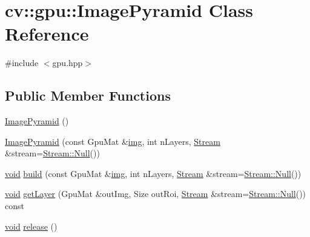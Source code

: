 \hypertarget{classcv_1_1gpu_1_1ImagePyramid}{\section{cv\-:\-:gpu\-:\-:Image\-Pyramid Class Reference}
\label{classcv_1_1gpu_1_1ImagePyramid}
}


{\ttfamily \#include $<$gpu.\-hpp$>$}

\subsection*{Public Member Functions}
\begin{DoxyCompactItemize}
\item 
\hyperlink{classcv_1_1gpu_1_1ImagePyramid_a3d5bb59a2aac09dfd542b9a4e805f0ad}{Image\-Pyramid} ()
\item 
\hyperlink{classcv_1_1gpu_1_1ImagePyramid_a68fb8a2ad9fb79b4290c4475c1bc04db}{Image\-Pyramid} (const Gpu\-Mat \&\hyperlink{legacy_8hpp_a5349238b3772bed6eae0fda3117ccfef}{img}, int n\-Layers, \hyperlink{classcv_1_1gpu_1_1Stream}{Stream} \&stream=\hyperlink{classcv_1_1gpu_1_1Stream_af96c23564834f88333dcb8997df553f1}{Stream\-::\-Null}())
\item 
\hyperlink{legacy_8hpp_a8bb47f092d473522721002c86c13b94e}{void} \hyperlink{classcv_1_1gpu_1_1ImagePyramid_a4fe3f5291035fec7f62ea4fe10c431c8}{build} (const Gpu\-Mat \&\hyperlink{legacy_8hpp_a5349238b3772bed6eae0fda3117ccfef}{img}, int n\-Layers, \hyperlink{classcv_1_1gpu_1_1Stream}{Stream} \&stream=\hyperlink{classcv_1_1gpu_1_1Stream_af96c23564834f88333dcb8997df553f1}{Stream\-::\-Null}())
\item 
\hyperlink{legacy_8hpp_a8bb47f092d473522721002c86c13b94e}{void} \hyperlink{classcv_1_1gpu_1_1ImagePyramid_a93cefa5ee329319690c6c1af2be9f992}{get\-Layer} (Gpu\-Mat \&out\-Img, Size out\-Roi, \hyperlink{classcv_1_1gpu_1_1Stream}{Stream} \&stream=\hyperlink{classcv_1_1gpu_1_1Stream_af96c23564834f88333dcb8997df553f1}{Stream\-::\-Null}()) const 
\item 
\hyperlink{legacy_8hpp_a8bb47f092d473522721002c86c13b94e}{void} \hyperlink{classcv_1_1gpu_1_1ImagePyramid_a7c6de7ab90826b9cd597a34b7f93dfb7}{release} ()
\end{DoxyCompactItemize}


